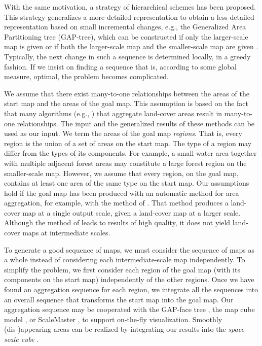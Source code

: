 \documentclass[acmsmall,natbib=false]{acmart}
\begin{document}
With the same motivation, a strategy of hierarchical schemes 
has been proposed.
This strategy generalizes a more-detailed representation 
to obtain a less-detailed representation 
based on small incremental changes, 
e.g., the Generalized Area Partitioning tree 
(GAP-tree),
which can be constructed if only the larger-scale map is given
\citep{vanOosterom1995Development} 
or if both the larger-scale map and the smaller-scale map 
are given \citep{HaunertDilo2009}.
Typically, the next change in such a sequence 
is determined locally, 
in a greedy fashion.  
If we insist on finding a sequence that is, 
according to some global measure, optimal, 
the problem becomes complicated.


We assume that there exist many-to-one relationships between the 
areas of the
start map and the areas of the goal map.
This assumption is based on the fact that many algorithms (e.g., \citealp{HaunertWolff2010AreaAgg,vanSmaalen2003,Oehrlein2017Aggregation})
that aggregate land-cover areas
result in many-to-one relationships.
The input and the generalized results of these methods 
can be used as our input.
We term the areas of the goal map \emph{regions}.
That is, every region is the union of a set of areas 
on the start map.
The type of a region may differ from the types of its 
components. 
For example, a small water area together with 
multiple adjacent forest areas may constitute 
a large forest region on the smaller-scale map.
However, we assume that every region, on the goal map, 
contains at least one area of the same type on the start map.
Our assumptions hold if the goal map has been produced 
with an automatic method for area aggregation, 
for example, with the method of \citet{HaunertWolff2010AreaAgg}.
That method produces a land-cover map at a single output scale, 
given a land-cover map at a larger scale.
Although the method of \textcite{HaunertWolff2010AreaAgg}
leads to results of high quality, 
it does not yield land-cover maps at intermediate scales.


To generate a good sequence of maps, 
we must consider the sequence of maps as a whole 
instead of considering each intermediate-scale map independently.
To simplify the problem,
we first consider each region of the goal map 
(with its components on the start map) 
independently of the other regions.
Once we have found an aggregation sequence for each region, 
we integrate all the sequences into an overall sequence 
that transforms the start map into the goal map. 
Our aggregation sequence may be cooperated with
the GAP-face tree \citep{vanOosterom2005},
the map cube model \citep{Timpf1998},
or ScaleMaster \citep{Brewer2007Guidelines,Touya2013ScaleMaster}, 
to support on-the-fly visualization.
Smoothly (dis-)appearing areas can be realized
by integrating our results into the \emph{space-scale cube}
\parencite{vanOosterom2014tGAP,vanOosterom2014tGAPSSC}.
\end{document}
